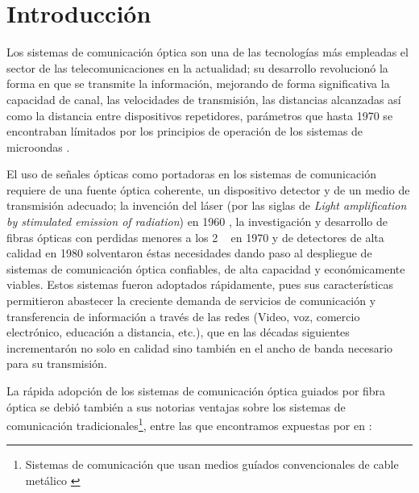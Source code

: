 

\chapter{Introducción}

Los sistemas de comunicación óptica son una de las tecnologías más empleadas el sector de las telecomunicaciones en la actualidad; su desarrollo revolucionó la forma en que se transmite la información, mejorando de forma significativa la capacidad de canal, las velocidades de transmisión, las distancias alcanzadas así como la distancia entre dispositivos repetidores, parámetros que hasta 1970 se encontraban límitados por los principios de operación de los sistemas de microondas \citep{Agrawal2012}.

El uso de señales ópticas como portadoras en los sistemas de comunicación requiere de una fuente óptica coherente, un dispositivo detector y de un medio de transmisión adecuado; la invención del láser (por las siglas de \textit{Light amplification by stimulated  emission of radiation}) en 1960 \citep{Rawicz2008}, la investigación y desarrollo de fibras ópticas con perdidas menores a los 2 \si{\deci\belmilliwatt} en 1970 y de detectores de alta calidad en 1980 \citep{Tomasi2003} solventaron éstas necesidades dando paso al despliegue de sistemas de comunicación óptica confiables, de alta capacidad y económicamente viables. Estos sistemas fueron adoptados rápidamente, pues sus características permitieron abastecer la creciente demanda de servicios de comunicación y transferencia de información a través de las redes (Video, voz, comercio electrónico, educación a distancia, etc.), que en las décadas siguientes incrementarón no solo en calidad sino también en el ancho de banda necesario para su transmisión\citep{keiser3}.

La rápida adopción de los sistemas de comunicación óptica guiados por fibra óptica se debió también a sus notorias ventajas sobre los sistemas de comunicación tradicionales\footnote{Sistemas de comunicación que usan medios guíados convencionales de cable metálico \citep{Tomasi2003}}, entre las que encontramos expuestas por \citeauthor*{Tomasi2003} en \citep{Tomasi2003}: 

